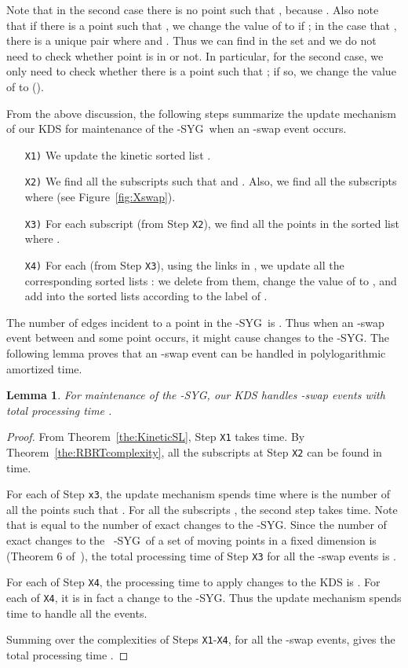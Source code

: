 \documentclass[preprint,12pt]{elsarticle}
\def\1syg{\mbox{-SYG}}
\newtheorem{lemma}{Lemma}[section]
\begin{document}
Note that in the second case there is no point  such that , because . Also note that if there is a point  such that , we change the value of  to  if ; in the case that , there is a unique pair  where  and . Thus we can find  in the set  and we do not need to check whether point  is in  or not. In particular, for the second case, we only need to check whether there is a point  such that ; if so, we change the value of  to  ().

From the above discussion, the following steps summarize the update mechanism of our KDS for maintenance of the \1syg~when an -swap event occurs.

\begin{itemize}
\item[\texttt{X1)}] We update the kinetic sorted list .
\item[\texttt{X2)}] We find all the subscripts  such that  and . Also, we find all the subscripts  where  (see Figure~\ref{fig:Xswap}).
\item[\texttt{X3)}] For each subscript  (from Step \texttt{X2}), we find all the points  in the sorted list  where .
\item[\texttt{X4)}] For each  (from Step \texttt{X3}), using the links in , we update all the corresponding sorted lists : we delete  from them, change the value of  to , and add  into the sorted lists according to the label of .
\end{itemize}

The number of edges incident to a point  in the \1syg~is . Thus when an -swap event between  and some point  occurs, it might cause  changes to the \1syg. The following lemma proves that an -swap event can be handled in polylogarithmic amortized time.

\begin{lemma}\label{the:Xswap}
For maintenance of the \1syg, our KDS handles  -swap events with total processing time .
\end{lemma}
\begin{proof} 
From Theorem~\ref{the:KineticSL}, Step \texttt{X1} takes  time.  By Theorem~\ref{the:RBRTcomplexity}, all the subscripts  at Step \texttt{X2} can be found in  time.

For each  of Step \texttt{x3}, the update mechanism spends  time where  is the number of all the points  such that . For all the subscripts , the second step takes  time. Note that  is equal to the number of exact changes to the \1syg. Since the number of exact changes to the ~\1syg~of a set of  moving points in a fixed dimension  is  (Theorem 6 of~\cite{Rahmati2014}), the total processing time of Step \texttt{X3} for all the  -swap events is . 

For each  of Step \texttt{X4}, the processing time to apply changes to the KDS is . For each  of \texttt{X4}, it is in fact a change to the \1syg. Thus the update mechanism spends  time to handle all the  events.

Summing over the complexities of Steps \texttt{X1}-\texttt{X4}, for all the -swap events, gives the total processing time  .
\end{proof}
\end{document}
